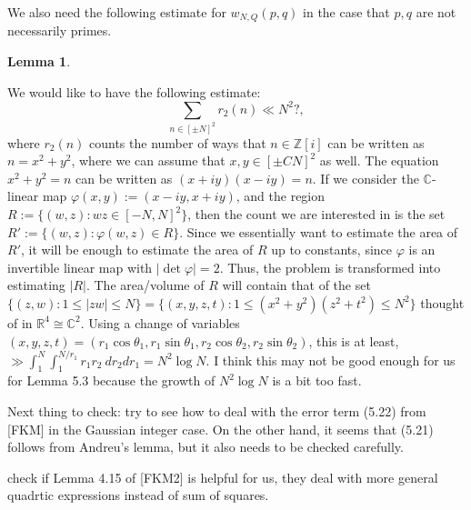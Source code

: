 \documentclass[11pt]{amsart}
\newtheorem{lemma}{Lemma}[section]
\theoremstyle{definition}
\newcommand{\C}{{\mathbb C}}
\newcommand{\R}{{\mathbb R}}
\newcommand{\Z}{{\mathbb Z}}
\begin{document}
We also need the following estimate for $w_{N,Q}(p,q)$ in the case that $p, q$ are not necessarily primes.
\begin{lemma}
    
\end{lemma}
We would like to have the following estimate:
\[
\sum_{n \in [\pm N]^2} r_2(n) \ll N^2?,
\]
where $r_2(n)$ counts the number of ways that $n \in \Z[i]$ can be written as $n=x^2+y^2$, where we can assume that $x, y \in [\pm CN]^2$ as well.
{\color{red} The equation $x^2+y^2=n$ can be written as $(x+iy)(x-iy)=n$. If we consider the $\C$-linear map $\varphi(x,y):=(x-iy,x+iy)$, and the region $R:=\{(w,z) : wz \in [-N,N]^2\}$, then the count we are interested in is the set $R':=\{(w,z) : \varphi(w,z) \in R\}$. Since we essentially want to estimate the area of $R'$, it will be enough to estimate the area of $R$ up to constants, since $\varphi$ is an invertible linear map with $|\det\varphi|=2$. Thus, the problem is transformed into estimating $|R|$. The area/volume of $R$ will contain that of the set $\{(z,w) : 1 \leq |zw| \leq N\} =\{(x,y,z,t) : 1 \leq (x^2+y^2)(z^2+t^2)\leq N^2\}$ thought of in $\R^4 \cong \C^2$. Using a change of variables $(x,y,z,t)=(r_1\cos\theta_1,r_1\sin\theta_1,r_2\cos\theta_2,r_2\sin\theta_2)$, this is at least, $\gg \int_1^N \int_1^{N/r_1} r_1r_2 \ dr_2dr_1 = N^2\log N$. I think this may not be good enough for us for Lemma 5.3 because the growth of $N^2\log N$ is a bit too fast.}


{\color{red} Next thing to check: try to see how to deal with the error term (5.22) from [FKM] in the Gaussian integer case. On the other hand, it seems that (5.21) follows from Andreu's lemma, but it also needs to be checked carefully.}

{\color{blue} check if Lemma 4.15 of [FKM2] is helpful for us, they deal with more general quadrtic expressions instead of sum of squares.}
\end{document}
